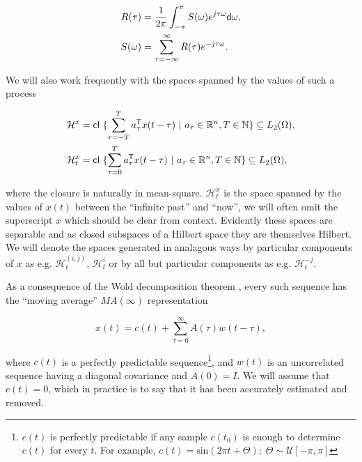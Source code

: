 \documentclass[12pt]{article}
\def\H{\mathcal{H}}  %
\begin{document}
\begin{equation}
  \label{eqn:fourier_pair}
  \begin{aligned}
    R(\tau) &= \frac{1}{2\pi}\int_{-\pi}^\pi S(\omega) e^{j\tau\omega}\mathsf{d} \omega,\\
    S(\omega) &= \sum_{\tau=-\infty}^\infty R(\tau)e^{-j\tau\omega}.
  \end{aligned}
\end{equation}

We will also work frequently with the spaces spanned by the values of
such a process

\begin{equation}
  \label{eq:hilbert_space_defn}
  \begin{aligned}
    \H^x &= \cl \{\sum_{\tau = -T}^T a_\tau^\T x(t - \tau)\ |\ a_\tau \in \R^n, T \in \N\} \subseteq L_2(\Omega),\\
    \H_t^x &= \cl \{\sum_{\tau = 0}^T a_\tau^\T x(t - \tau)\ |\ a_\tau \in \R^n, T \in \N\} \subseteq L_2(\Omega),
  \end{aligned}
\end{equation}

where the closure is naturally in mean-square.  $\H_t^x$ is the space
spanned by the values of $x(t)$ between the ``infinite past'' and
``now'', we will often omit the superscript $x$ which should be clear
from context.  Evidently these spaces are separable and as closed
subspaces of a Hilbert space they are themselves Hilbert.  We will
denote the spaces generated in analagous ways by particular components
of $x$ as e.g. $\H_t^{(i, j)}$, $\H_t^{i}$ or by all but particular
components as e.g. $\H_t^{-j}$.

As a consequence of the Wold decomposition theorem \cite{lindquist},
every such sequence has the ``moving average'' $MA(\infty)$
representation

\begin{equation}
\label{eqn:wold}
  x(t) = c(t) + \sum_{\tau = 0}^\infty A(\tau) w(t - \tau),
\end{equation}

where $c(t)$ is a perfectly predictable sequence\footnote{$c(t)$ is
  perfectly predictable if any sample $c(t_0)$ is enough to determine
  $c(t)$ for every $t$.  For example,
  $c(t) = \text{sin}(2\pi t + \Theta);\; \Theta \sim \mathcal{U}[-\pi,
  \pi]$}, and $w(t)$ is an uncorrelated sequence having a diagonal
covariance and $A(0) = I$.  We will assume that $c(t) = 0$, which in
practice is to say that it has been accurately estimated and removed.
\end{document}
